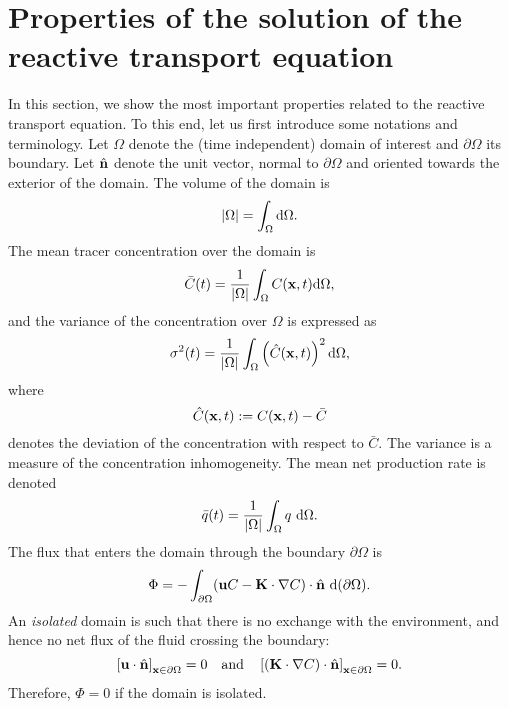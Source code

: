 \section{Properties of the solution of the reactive transport equation}\label{sec:propcontinuous}
In this section, we show the most important properties related to the reactive transport equation. To this end, let us first introduce some notations and terminology. Let $\Omega$ denote the (time independent) domain of interest and $\partial \Omega$ its boundary. Let $\hat{\b n}$ denote the unit vector, normal to $\partial \Omega$ and oriented towards the exterior of the domain. The volume of the domain is
\begin{equation}
	|\Omega| = \int_{\Omega} \rm d\Omega.	
\end{equation}
The mean tracer concentration over the domain is
\begin{equation} \label{eq:Cmean}
	\bar{C}(t) = \frac{1}{|\Omega|}\int_{\Omega} C(\b x,t) \rm d\Omega,
\end{equation}
and the variance of the concentration over $\Omega$ is expressed as
\begin{equation} \label{eq:sigma2continuous}
 	\sigma^2(t) = \frac{1}{|\Omega|} \int_{\Omega} \left(\hat C(\b x,t)\right)^2 \rm d\Omega,
\end{equation}
where 
\begin{equation} \label{eq:Chat}
	\hat C(\b x,t) := C(\b x,t) - \bar C	
\end{equation}
denotes the deviation of the concentration with respect to $\bar C$.
The variance is a measure of the concentration inhomogeneity.
The mean net production rate is denoted
\begin{equation}
	\bar q(t) = \frac{1}{|\Omega|}\int_\Omega q\ \rm d\Omega.
\end{equation}
The flux that enters the domain through the boundary $\partial \Omega$ is
\begin{equation}
	\Phi = -\int_{\partial \Omega} (\b uC - \b K \cdot \nabla C)\cdot \n\ \rm d(\partial \Omega).
\end{equation}
An \textit{isolated} domain is such that there is no exchange with the environment, and hence no net flux of the fluid crossing the boundary:
\begin{equation} \label{eq:isolateddomain}
	\left[ \b u \cdot \hat{\b n}\right]_{\b x \in \partial \Omega} = 0 \quad \mbox{and} \quad \left[ (\b K \cdot \nabla C) \cdot \hat{\b n}\right]_{\b x \in \partial \Omega} = 0.
\end{equation}
Therefore, $\Phi=0$ if the domain is isolated.

